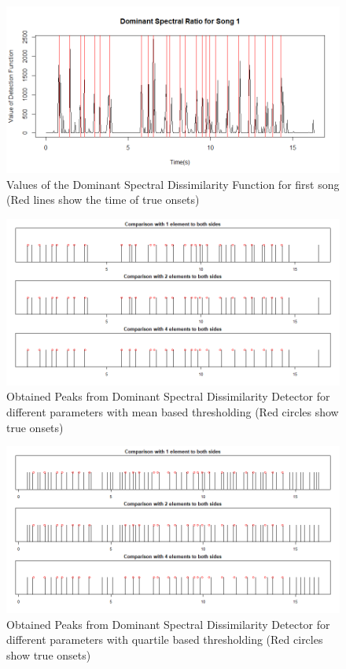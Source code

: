 \documentclass[10pt]{article}
\begin{document}
\begin{figure}
    \centering
    \includegraphics[width = \textwidth]{dfreq_song1.png}
    \caption{Values of the Dominant Spectral Dissimilarity Function for first song (Red lines show the time of true onsets)}
    \label{fig:dfreq_song1}
\end{figure}

\begin{figure}
    \centering
    \includegraphics[width = \textwidth]{dfreq_onsets_song1.png}
    \caption{Obtained Peaks from Dominant Spectral Dissimilarity Detector for different parameters with mean based thresholding (Red circles show true onsets)}
    \label{fig:dfreq_onsets_song1}
\end{figure}

\begin{figure}
    \centering
    \includegraphics[width = \textwidth]{dfreq_onsets_song1_type2.png}
    \caption{Obtained Peaks from Dominant Spectral Dissimilarity Detector for different parameters with quartile based thresholding (Red circles show true onsets)}
    \label{fig:dfreq_onsets_song1_type2}
\end{figure}
\end{document}
